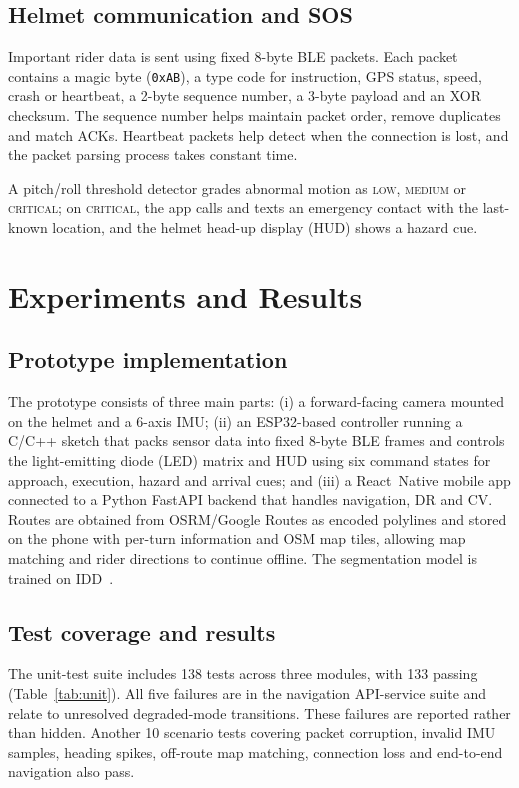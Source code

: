 \documentclass[conference]{IEEEtran}
\begin{document}
\subsection{Helmet communication and SOS}
Important rider data is sent using fixed 8-byte BLE packets. Each packet contains a magic byte (\texttt{0xAB}), a type code for instruction, GPS status, speed, crash or heartbeat, a 2-byte sequence number, a 3-byte payload and an XOR checksum. The sequence number helps maintain packet order, remove duplicates and match ACKs. Heartbeat packets help detect when the connection is lost, and the packet parsing process takes constant time.

A pitch/roll threshold detector grades abnormal motion as \textsc{low}, \textsc{medium} or \textsc{critical}; on \textsc{critical}, the app calls and texts an emergency contact with the last-known location, and the helmet head-up display (HUD) shows a hazard cue.

\section{Experiments and Results}
\label{sec:eval}

\subsection{Prototype implementation}
The prototype consists of three main parts: (i) a forward-facing camera mounted on the helmet and a 6-axis IMU; (ii) an ESP32-based controller running a C/C++ sketch that packs sensor data into fixed 8-byte BLE frames and controls the light-emitting diode (LED) matrix and HUD using six command states for approach, execution, hazard and arrival cues; and (iii) a React~Native mobile app connected to a Python FastAPI backend that handles navigation, DR and CV. Routes are obtained from OSRM/Google Routes as encoded polylines and stored on the phone with per-turn information and OSM map tiles, allowing map matching and rider directions to continue offline. The segmentation model is trained on IDD~\cite{iddvarma2019}.

\subsection{Test coverage and results}
The unit-test suite includes 138 tests across three modules, with 133 passing (Table~\ref{tab:unit}). All five failures are in the navigation API-service suite and relate to unresolved degraded-mode transitions. These failures are reported rather than hidden. Another 10 scenario tests covering packet corruption, invalid IMU samples, heading spikes, off-route map matching, connection loss and end-to-end navigation also pass.
\end{document}
